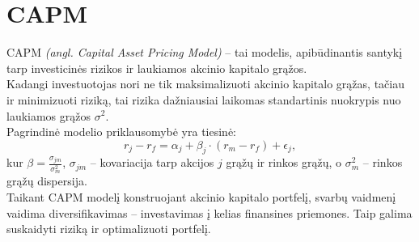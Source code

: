 \documentclass[a4paper]{article}
\begin{document}
\section{ CAPM }
CAPM \textit{(angl. Capital Asset Pricing Model)} -- tai modelis, apibūdinantis santykį tarp investicinės rizikos ir laukiamos akcinio kapitalo grąžos. \\
\indent Kadangi investuotojas nori ne tik maksimalizuoti akcinio kapitalo grąžas, tačiau ir minimizuoti riziką, tai rizika dažniausiai laikomas standartinis nuokrypis nuo laukiamos grąžos $ {\sigma}^2 $.\\
\indent Pagrindinė modelio priklausomybė yra tiesinė:
 $$ r_j - r_f =\alpha_j + \beta_j\cdot(r_m - r_f) + \epsilon_j, $$ 
kur $ \beta  =\frac{\sigma_{jm}}{\sigma^2_m} $, $ \sigma_{jm} $ -- kovariacija tarp akcijos $ j $ grąžų ir rinkos grąžų, o $ \sigma^2_m $ -- rinkos grąžų dispersija.\\
\indent Taikant CAPM modelį konstruojant akcinio kapitalo portfelį, svarbų vaidmenį vaidima diversifikavimas -- investavimas į kelias finansines priemones. Taip galima suskaidyti riziką ir optimalizuoti portfelį.
\end{document}
